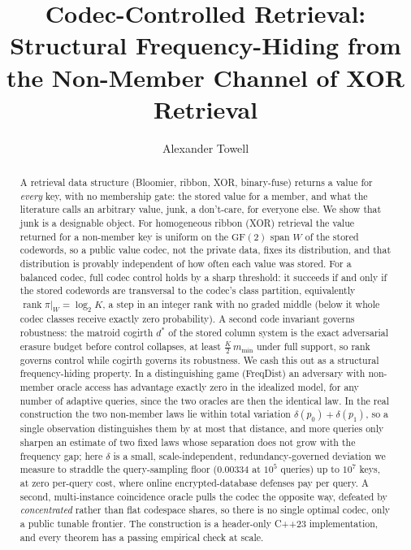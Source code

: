 \documentclass[acmsmall,review]{acmart}
\newcommand{\GF}{\mathrm{GF}(2)}
\DeclareMathOperator{\rank}{rank}
\newcommand{\W}{W}                          %
\newcommand{\proj}{\pi}                     %
\begin{document}
\title{Codec-Controlled Retrieval: Structural Frequency-Hiding from the Non-Member Channel of XOR Retrieval}
\author{Alexander Towell}

\begin{abstract}
A retrieval data structure (Bloomier, ribbon, XOR, binary-fuse) returns a value
for \emph{every} key, with no membership gate: the stored value for a member, and
what the literature calls an arbitrary value, junk, a don't-care, for everyone else.
We show that junk is a designable object. For homogeneous ribbon (XOR) retrieval the
value returned for a non-member key is uniform on the $\GF$ span $\W$ of the stored
codewords, so a public value codec, not the private data, fixes its distribution, and
that distribution is provably independent of how often each value was stored. For a
balanced codec, full codec control holds by a sharp threshold: it succeeds if and only
if the stored codewords are transversal to the codec's class partition, equivalently
$\rank \proj|_{\W} = \log_2 K$, a step in an integer rank with no graded middle (below
it whole codec classes receive exactly zero probability). A second code invariant
governs robustness: the matroid cogirth $d^\ast$ of the stored column system is the
exact adversarial erasure budget before control collapses, at least
$\tfrac{K}{2}\,m_{\min}$ under full support, so rank governs control while cogirth
governs its robustness. We cash this out as a structural frequency-hiding property. In
a distinguishing game (FreqDist) an adversary with non-member oracle access has
advantage exactly zero in the idealized model, for any number of adaptive queries,
since the two oracles are then the identical law. In the real construction the two
non-member laws lie within total variation $\delta(p_0)+\delta(p_1)$, so a single
observation distinguishes them by at most that distance, and more queries only sharpen
an estimate of two fixed laws whose separation does not grow with the frequency gap; here $\delta$
is a small, scale-independent, redundancy-governed deviation we measure to straddle the
query-sampling floor ($0.00334$ at $10^5$ queries) up to $10^7$ keys, at zero per-query
cost, where online encrypted-database defenses pay per query. A second,
multi-instance coincidence oracle pulls the codec the opposite way, defeated by
\emph{concentrated} rather than flat codespace shares, so there is no single optimal
codec, only a public tunable frontier. The construction is a header-only C++23
implementation, and every theorem has a passing empirical check at scale.
\end{abstract}
\end{document}
